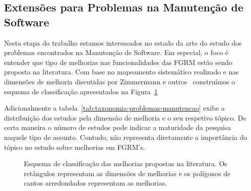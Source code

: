 \subsection{Extensões para Problemas na Manutenção de Software}
\label{sub:extensões_para_problemas_na_manutenção_de_software}

Nesta etapa do trabalho estamos interessados no estado da arte do estudo dos
problemas encontrados na Manutenção de Software. Em especial, o foco é
entender que tipo de melhorias nas funcionalidades das FGRM estão sendo proposta
na literatura. Com base no mapeamento sistemático realizado e nas dimensões de
melhoria discutidas por Zimmermann e outros~\cite{5070993} construímos o esquema
de classificação apresentados na
Figura~\ref{fig:diagrama-esquema-dimensao-melhorias}

Adicionalmente a tabela~\ref{tab:taxonomia-problemas-manutencao} exibe a
distribuição dos estudos pela dimensão de melhoria e o seu respetivo tópico. De
 certa maneira o número de estudos  pode indicar a maturidade da pesquisa
naquele tipo de assunto. Contudo, não representa diretamente a importância do
tópico no estudo sobre melhorias em FGRM's.



\begin{figure}[tb] \centering
	\caption{Esquema de classificação das melhorias propostas na literatura. Os
		retângulos representam as dimensões de melhorias e os polígonos de
		cantos arredondados representam as melhorias.}
	\label{fig:diagrama-esquema-dimensao-melhorias} \end{figure}

